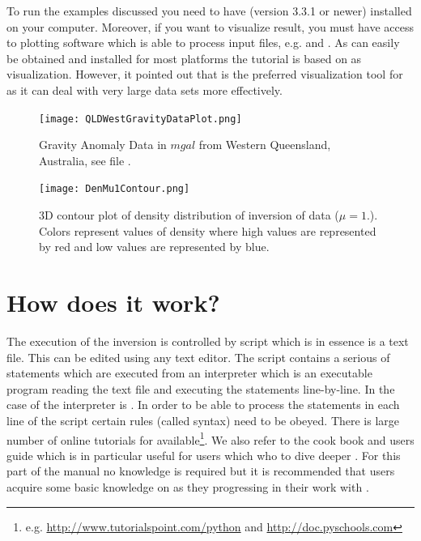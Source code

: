 To run the examples discussed you need to have \escript (version 3.3.1 or newer) installed on your computer.
Moreover, if you want to visualize result, you must have access to plotting software which is able to process
\VTK input files, e.g. \mayavi and \VisIt. As \mayavi can easily be obtained and installed for most platforms
the tutorial is based on \mayavi as visualization. However, it pointed out 
that \VisIt is the preferred visualization tool for \escript as it can deal with very large data sets more effectively.
    
\begin{figure}
\centering
\texttt{[image: QLDWestGravityDataPlot.png]}
\caption{Gravity Anomaly Data in $mgal$ from Western Queensland, Australia, see file .
 }
\label{FIG:P1:GRAV:0}
\end{figure}

\begin{figure}
\centering
\texttt{[image: DenMu1Contour.png]}
\caption{3D contour plot of density distribution of inversion of data  ($\mu=1.$). Colors
represent values of density where high values are represented by red and low values are represented by blue.
 }
\label{FIG:P1:GRAV:1}
\end{figure}

\section{How does it work?}
The execution of the inversion is controlled by script which is in essence is a text file. This can be edited using any 
text editor. The script contains a serious of statements which are executed from an interpreter which
is an executable program reading the text file and executing the statements line-by-line. In the case 
of \downunder the interpreter is \python. In order to be able to process the statements in each line of the script
certain rules (called syntax) need to be obeyed. There is large number of online tutorials for \python 
available\footnote{e.g. \url{http://www.tutorialspoint.com/python} and \url{http://doc.pyschools.com}}. We also 
refer to the \escript cook book \cite{ESCRIPTCOOKBOOK} and users guide \cite{ESCRIPT} which is in particular useful for users which who to dive deeper
\downunder. For this part of the manual no \python knowledge is required but it is recommended that 
users acquire some basic knowledge on \python as they progressing in their work with \downunder.

